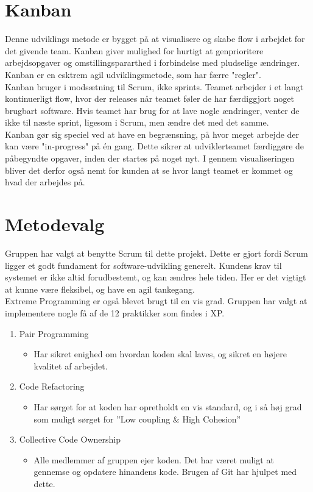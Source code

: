 \section{Kanban}\label{sec:kanban}
Denne udviklings metode er bygget på at visualisere og skabe flow i arbejdet for det givende team. Kanban giver 
mulighed for hurtigt at genprioritere arbejdsopgaver og omstillingspararthed i forbindelse med pludselige ændringer. 
Kanban er en esktrem agil udviklingsmetode, som har færre "regler".\\

Kanban\cite{Kanban} bruger i modsætning til Scrum, ikke sprints. Teamet arbejder i et langt kontinuerligt flow, hvor der releases
når teamet føler de har færdiggjort noget brugbart software. Hvis teamet har brug for at lave nogle ændringer,
venter de ikke til næste sprint, ligesom i Scrum, men ændre det med det samme. \\

Kanban gør sig speciel ved at have en begrænsning, på hvor meget arbejde der kan være "in-progress" på én gang. 
Dette sikrer at udviklerteamet færdiggøre de påbegyndte opgaver, inden der startes på noget nyt. 
I gennem visualiseringen bliver det derfor også nemt for kunden at se hvor langt teamet er kommet og
hvad der arbejdes på.

\section{Metodevalg}\label{sec:valgafvaektoej}
Gruppen har valgt at benytte Scrum til dette projekt. Dette er gjort fordi Scrum ligger et godt fundament 
for software-udvikling generelt. Kundens krav til systemet er ikke altid forudbestemt, og kan ændres hele tiden. 
Her er det vigtigt at kunne være fleksibel, og have en agil tankegang. \\
Extreme Programming er også blevet brugt til en vis grad. Gruppen har valgt at implementere nogle få 
af de 12 praktikker som findes i XP. 
\begin{enumerate}
    \item Pair Programming
    \begin{itemize}
        \item Har sikret enighed om hvordan koden skal laves, og sikret en højere kvalitet af arbejdet.
    \end{itemize}

    \item Code Refactoring
    \begin{itemize}
        \item Har sørget for at koden har opretholdt en vis standard, og i så høj grad som muligt sørget for ”Low coupling \& High Cohesion”
    \end{itemize}
    
    \item Collective Code Ownership
    \begin{itemize}
        \item Alle medlemmer af gruppen ejer koden. Det har været muligt at gennemse og opdatere hinandens kode. 
        Brugen af Git har hjulpet med dette. 
    \end{itemize}
\end{enumerate}

